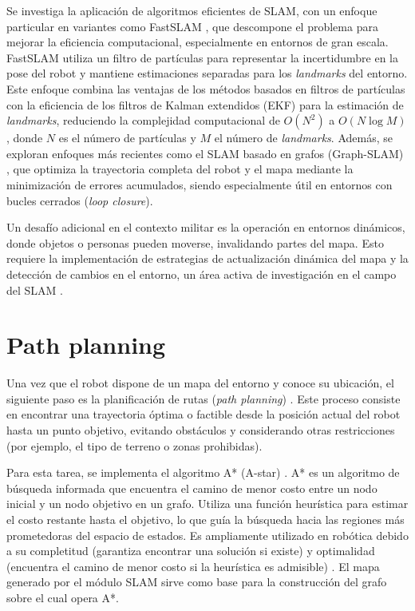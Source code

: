 Se investiga la aplicación de algoritmos eficientes de SLAM, con un enfoque particular en variantes como FastSLAM \citep{montemerlo2002fastslam,montemerlo2003fastslam}, que descompone el problema para mejorar la eficiencia computacional, especialmente en entornos de gran escala. FastSLAM utiliza un filtro de partículas para representar la incertidumbre en la pose del robot y mantiene estimaciones separadas para los \textit{landmarks} del entorno. Este enfoque combina las ventajas de los métodos basados en filtros de partículas con la eficiencia de los filtros de Kalman extendidos (EKF) para la estimación de \textit{landmarks}, reduciendo la complejidad computacional de $O(N^2)$ a $O(N \log M)$, donde $N$ es el número de partículas y $M$ el número de \textit{landmarks}. Además, se exploran enfoques más recientes como el SLAM basado en grafos (Graph-SLAM) \citep{grisetti2010tutorial,bailey2006simultaneous}, que optimiza la trayectoria completa del robot y el mapa mediante la minimización de errores acumulados, siendo especialmente útil en entornos con bucles cerrados (\textit{loop closure}).

Un desafío adicional en el contexto militar es la operación en entornos dinámicos, donde objetos o personas pueden moverse, invalidando partes del mapa. Esto requiere la implementación de estrategias de actualización dinámica del mapa y la detección de cambios en el entorno, un área activa de investigación en el campo del SLAM \citep{bailey2006simultaneous,wang2007learning}.

\section{Path planning}
Una vez que el robot dispone de un mapa del entorno y conoce su ubicación, el siguiente paso es la planificación de rutas (\textit{path planning}) \citep{lavalle2006planning}. Este proceso consiste en encontrar una trayectoria óptima o factible desde la posición actual del robot hasta un punto objetivo, evitando obstáculos y considerando otras restricciones (por ejemplo, el tipo de terreno o zonas prohibidas).

Para esta tarea, se implementa el algoritmo A* (A-star) \citep{hart1968formal,russell2020aima}. A* es un algoritmo de búsqueda informada que encuentra el camino de menor costo entre un nodo inicial y un nodo objetivo en un grafo. Utiliza una función heurística para estimar el costo restante hasta el objetivo, lo que guía la búsqueda hacia las regiones más prometedoras del espacio de estados. Es ampliamente utilizado en robótica debido a su completitud (garantiza encontrar una solución si existe) y optimalidad (encuentra el camino de menor costo si la heurística es admisible) \citep{hart1968formal}. El mapa generado por el módulo SLAM sirve como base para la construcción del grafo sobre el cual opera A*.

